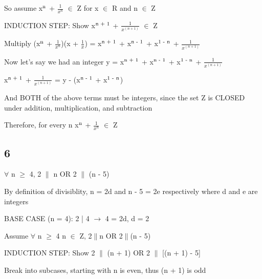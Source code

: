 \documentclass{article}
\begin{document}
\noindent So assume x$\textsuperscript{n}$ + $\frac{1}{x^n}$ $\in$ Z for x $\in$ R and n $\in$ Z \vspace{0.5cm}

\noindent INDUCTION STEP: Show x$\textsuperscript{n + 1}$ + $\frac{1}{x^(n+1)}$ $\in$ Z \vspace{0.5cm}

\noindent Multiply (x$\textsuperscript{n}$ + $\frac{1}{x^n}$)(x + $\frac{1}{x}$) = x$\textsuperscript{n + 1}$ + x$\textsuperscript{n - 1}$ + x$\textsuperscript{1 - n}$ + $\frac{1}{x^(n + 1)}$ \vspace{0.5cm}

\noindent Now let's say we had an integer y = x$\textsuperscript{n + 1}$ + x$\textsuperscript{n - 1}$ + x$\textsuperscript{1 - n}$ + $\frac{1}{x^(n + 1)}$  \vspace{0.5cm}

\noindent x$\textsuperscript{n + 1}$ + $\frac{1}{x^(n + 1)}$ = y - (x$\textsuperscript{n - 1}$ + x$\textsuperscript{1 - n}$) \vspace{0.5cm}

\noindent And BOTH of the above terms must be integers, since the set Z is CLOSED under addition, multiplication, and subtraction \vspace{0.5cm}

\noindent Therefore, for every n x$\textsuperscript{n}$ + $\frac{1}{x^n}$ $\in$ Z

\subsection{6}

\noindent $\forall$ n $\geq$ 4, 2 $\|$ n OR 2 $\|$ (n - 5) \vspace{0.5cm}

\noindent By definition of divisiblity, n = 2d and n - 5 = 2e respectively where d and e are integers \vspace{0.5cm}

\noindent BASE CASE (n = 4): 2 | 4 $\rightarrow$ 4 = 2d, d = 2 \vspace{0.5cm}

\noindent Assume $\forall$ n $\geq$ 4 n $\in$ Z, 2$\|$n OR 2$\|$(n - 5) \vspace{0.5cm}

\noindent INDUCTION STEP: Show 2 $\|$ (n + 1) OR 2 $\|$ [(n + 1) - 5] \vspace{0.5cm}

\noindent Break into subcases, starting with n is even, thus (n + 1) is odd \vspace{0.5cm}
\end{document}
